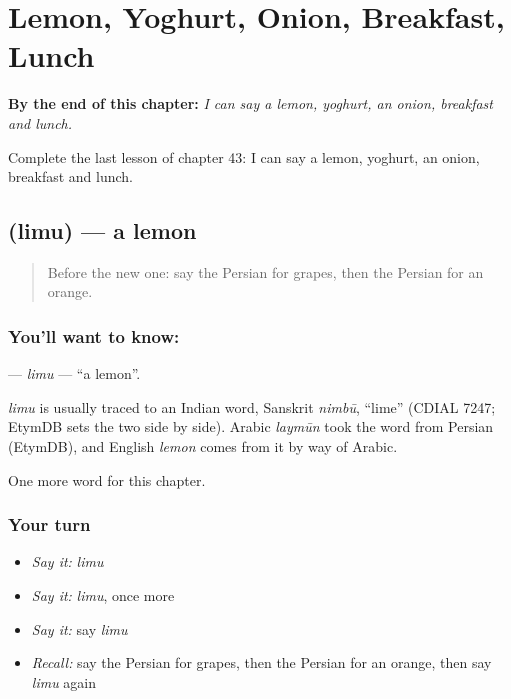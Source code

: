 
\chapter{Lemon, Yoghurt, Onion, Breakfast, Lunch}
\label{ch:fa-lemon-yoghurt-onion-breakfast-lunch}

\begin{chapteropening}
\textbf{By the end of this chapter:} \emph{I can say a lemon, yoghurt, an onion, breakfast and lunch.}

Complete the last lesson of chapter 43: I can say a lemon, yoghurt, an onion, breakfast and lunch.
\end{chapteropening}

\section[\texorpdfstring{\fa{لیمو} (limu)}{لیمو (limu)}]{ (limu) — a lemon}

\label{lesson:FA-C43-limu}



\begin{quote}
Before the new one: say the Persian for grapes, then the Persian for an orange.
\end{quote}

\subsection*{You'll want to know: }
\textbf{} — \emph{limu} — \textquotedblleft{}a lemon\textquotedblright{}.

\begin{cousinweb}
\emph{limu} is usually traced to an Indian word, Sanskrit \emph{nimbū}, \textquotedblleft{}lime\textquotedblright{} (CDIAL 7247; EtymDB sets the two side by side). Arabic \emph{laymūn} took the word from Persian (EtymDB), and English \emph{lemon} comes from it by way of Arabic.
\end{cousinweb}

\begin{grammarlens}[title={What you've built}]
One more word for this chapter.
\end{grammarlens}

\subsection*{Your turn}
\begin{itemize}
\raggedright
  \item \emph{Say it:} \emph{limu}
  \item \emph{Say it:} \emph{limu}, once more
  \item \emph{Say it:} say \emph{limu}
  \item \emph{Recall:} say the Persian for grapes, then the Persian for an orange, then say \emph{limu} again
\end{itemize}

